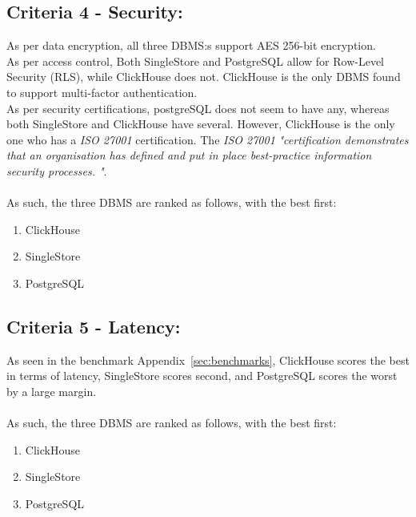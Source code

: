 \subsection{Criteria 4 - Security:}
As per data encryption, all three DBMS:s support AES 256-bit encryption.\\
As per access control, Both SingleStore and PostgreSQL allow for Row-Level Security (RLS), while ClickHouse does not.
ClickHouse is the only DBMS found to support multi-factor authentication.\\
As per security certifications, postgreSQL does not seem to have any, whereas both SingleStore and ClickHouse have several.
However, ClickHouse is the only one who has a \textit{ISO 27001} certification. The \textit{ISO 27001} \textit{"certification demonstrates that an organisation has defined and put in place best-practice information security processes. "}\cite{ISO27001}.
\\\\
As such, the three DBMS are ranked as follows, with the best first:

\begin{enumerate}
    \item ClickHouse
    \item SingleStore
    \item PostgreSQL
\end{enumerate}

\subsection{Criteria 5 - Latency:}
As seen in the benchmark Appendix~\ref{sec:benchmarks}, ClickHouse scores the best in terms of latency, SingleStore scores second, and PostgreSQL scores the worst by a large margin.
\\\\
As such, the three DBMS are ranked as follows, with the best first:

\begin{enumerate}
    \item ClickHouse
    \item SingleStore
    \item PostgreSQL
\end{enumerate}